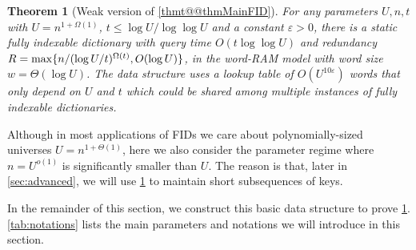 \documentclass{article}
\theoremstyle{plain}
\newtheorem{theorem}{Theorem}[section]  \newtheorem{lemma}[theorem]{Lemma}
\theoremstyle{definition}  \newtheorem{definition}[theorem]{Definition}
\DeclarePairedDelimiter{\BK}{\{}{\}}
\newcommand{\eps}{\varepsilon}
\begin{document}
\begin{theorem}[Weak version of \cref{thmt@@thmMainFID}]
  \label{thm:simple_FID}
  For any parameters $U, n, t$ with $U = n^{1 + \Omega(1)} $, $t \le \log U / \log \log U$ and a constant $\eps > 0$, there is a static fully indexable dictionary with query time $O(t\log \log U)$ and redundancy $R = \max\BK{n/(\log U/t)^{\Omega(t)}, O(\log U)}$, in the word-RAM model with word size $w = \Theta(\log U)$. The data structure uses a lookup table of $O(U^{10\eps})$ words that only depend on $U$ and $t$ which could be shared among multiple instances of fully indexable dictionaries.
\end{theorem}

Although in most applications of FIDs we care about polynomially-sized universes $U = n^{1 + \Theta(1)}$, here we also consider the parameter regime where $n = U^{o(1)}$ is significantly smaller than $U$. The reason is that, later in \cref{sec:advanced}, we will use \cref{thm:simple_FID} to maintain short subsequences of keys.

In the remainder of this section, we construct this basic data structure to prove \cref{thm:simple_FID}. \cref{tab:notations} lists the main parameters and notations we will introduce in this section.
\end{document}
